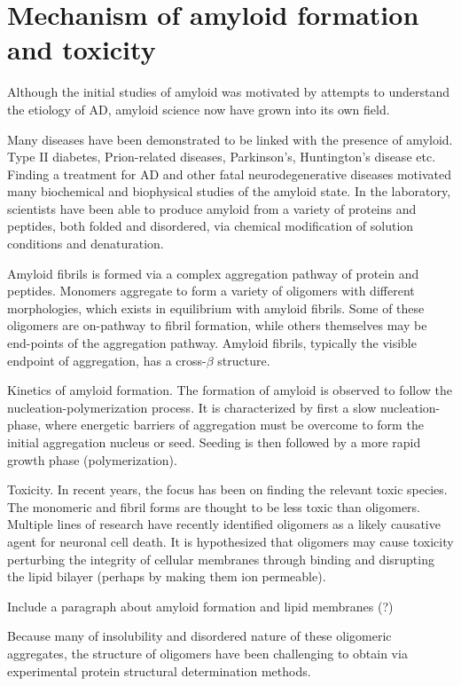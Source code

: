 \section{Mechanism of amyloid formation and toxicity}
\begin{outline}[enumerate]
	\1 Although the initial studies of amyloid was motivated by attempts to understand the etiology of AD, amyloid science now have grown into its own field.

	\1 Many diseases have been demonstrated to be linked with the presence of amyloid. Type II diabetes, Prion-related diseases, Parkinson's, Huntington's disease etc. Finding a treatment for AD and other fatal neurodegenerative diseases motivated many biochemical and biophysical studies of the amyloid state.  In the laboratory, scientists have been able to produce amyloid from a variety of proteins and peptides, both folded and disordered, via chemical modification of solution conditions and denaturation.

		\2 Amyloid fibrils is formed via a complex aggregation pathway of protein and peptides. Monomers aggregate to form a variety of oligomers with different morphologies, which exists in equilibrium with amyloid fibrils. Some of these oligomers are on-pathway to fibril formation, while others themselves may be end-points of the aggregation pathway. Amyloid fibrils, typically the visible endpoint of aggregation, has a cross-$\beta$ structure.

		\2 Kinetics of amyloid formation.  The formation of amyloid is observed to follow the nucleation-polymerization process. It is characterized by first a slow nucleation-phase, where energetic barriers of aggregation must be overcome to form the initial aggregation nucleus or seed.  Seeding is then followed by a more rapid growth phase (polymerization).

	\1 Toxicity. In recent years, the focus has been on finding the relevant toxic species. The monomeric and fibril forms are thought to be less toxic than oligomers. Multiple lines of research have recently identified oligomers as a likely causative agent for neuronal cell death.  It is hypothesized that oligomers may cause toxicity perturbing the integrity of cellular membranes through binding and disrupting the lipid bilayer (perhaps by making them ion permeable).

		\2 Include a paragraph about amyloid formation and lipid membranes (?)

	\1 Because many of insolubility and disordered nature of these oligomeric aggregates, the structure of oligomers have been challenging to obtain via experimental protein structural determination methods.
\end{outline}


